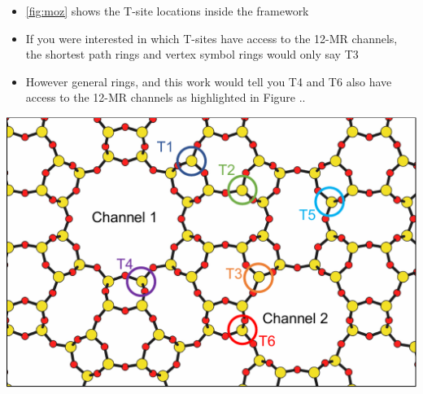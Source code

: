 \documentclass[11pt]{article}
\begin{document}
\begin{itemize}
\item \cref{fig:moz} shows the T-site locations inside the framework
\item If you were interested in which T-sites have access to the 12-MR channels, the shortest path rings and vertex symbol rings would only say T3
\item However general rings, and this work would tell you T4 and T6 also have access to the 12-MR channels as highlighted in Figure ..
\end{itemize}
\begin{center}
\includegraphics[width=.5\textwidth]{../figures/completed-figures/moz.pdf}
\end{center}
\end{document}
